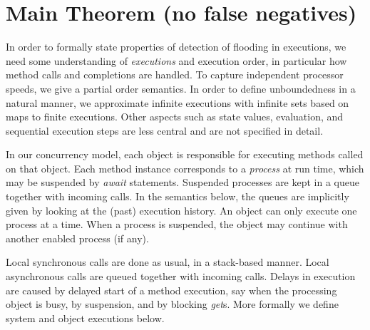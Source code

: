 


\section{Main Theorem (no false negatives)}


In order to formally state properties of detection of flooding in
executions, 
we need some understanding of \emph{executions} and execution order, 
in particular
how method calls and completions are handled.
To capture independent processor speeds,
we  give a partial order semantics.
In order to define unboundedness in a natural manner,
we  approximate infinite executions with 
infinite  sets based on maps to finite executions. 
Other aspects such as state values,  evaluation,
and sequential execution steps are less central
and are not specified in detail. 


In our concurrency model,
each object is responsible for executing methods called on that object.
Each method instance corresponds to a \emph{process} at run time, which may be suspended by \emph{await} statements.
Suspended processes are kept in a queue together with incoming calls.
In the semantics below, the queues are implicitly given by 
looking at the (past)  execution history.
An object can only execute one process at a time.
When a process is suspended, the object may continue
with another enabled process (if any).
%
Local synchronous calls are done as usual, in a stack-based manner.
Local asynchronous calls are queued together with incoming calls.
%
Delays in execution are caused by delayed start of a method
execution, say when the processing object is busy,  
by  suspension, %
and by blocking \emph{get}s.
More formally we define system and object executions below.

